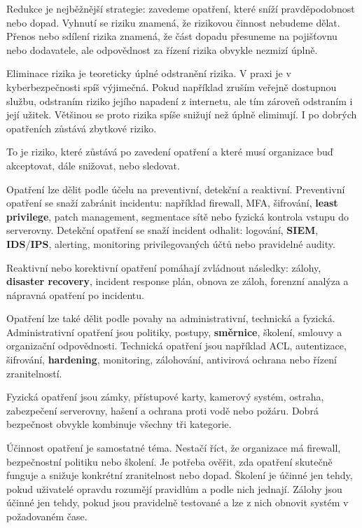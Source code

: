 Redukce je nejběžnější strategie: zavedeme opatření, které sníží pravděpodobnost nebo dopad. Vyhnutí se riziku znamená, že rizikovou činnost nebudeme dělat. Přenos nebo sdílení rizika znamená, že část dopadu přesuneme na pojišťovnu nebo dodavatele, ale odpovědnost za řízení rizika obvykle nezmizí úplně.

Eliminace rizika je teoreticky úplné odstranění rizika. V praxi je v kyberbezpečnosti spíš výjimečná. Pokud například zruším veřejně dostupnou službu, odstraním riziko jejího napadení z internetu, ale tím zároveň odstraním i její užitek. Většinou se proto rizika spíše snižují než úplně eliminují. I po dobrých opatřeních zůstává zbytkové riziko.

To je riziko, které zůstává po zavedení opatření a které musí organizace buď akceptovat, dále snižovat, nebo sledovat.

Opatření lze dělit podle účelu na preventivní, detekční a reaktivní. Preventivní opatření se snaží zabránit incidentu: například firewall, MFA, šifrování, \textbf{least privilege}, patch management, segmentace sítě nebo fyzická kontrola vstupu do serverovny. Detekční opatření se snaží incident odhalit: logování, \textbf{SIEM}, \textbf{IDS}/\textbf{IPS}, alerting, monitoring privilegovaných účtů nebo pravidelné audity.

Reaktivní nebo korektivní opatření pomáhají zvládnout následky: zálohy, \textbf{disaster recovery}, incident response plán, obnova ze záloh, forenzní analýza a nápravná opatření po incidentu.

Opatření lze také dělit podle povahy na administrativní, technická a fyzická. Administrativní opatření jsou politiky, postupy, \textbf{směrnice}, školení, smlouvy a organizační odpovědnosti. Technická opatření jsou například ACL, autentizace, šifrování, \textbf{hardening}, monitoring, zálohování, antivirová ochrana nebo řízení zranitelností.

Fyzická opatření jsou zámky, přístupové karty, kamerový systém, ostraha, zabezpečení serverovny, hašení a ochrana proti vodě nebo požáru. Dobrá bezpečnost obvykle kombinuje všechny tři kategorie.

Účinnost opatření je samostatné téma. Nestačí říct, že organizace má firewall, bezpečnostní politiku nebo školení. Je potřeba ověřit, zda opatření skutečně funguje a snižuje konkrétní zranitelnost nebo dopad. Školení je účinné jen tehdy, pokud uživatelé opravdu rozumějí pravidlům a podle nich jednají. Zálohy jsou účinné jen tehdy, pokud jsou pravidelně testované a lze z nich obnovit systém v požadovaném čase.

